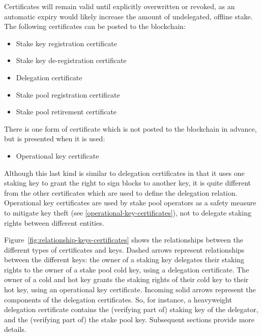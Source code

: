 \documentclass[11pt,a4paper,dvipsnames,twosided]{article}
\begin{document}
Certificates will remain valid
until explicitly overwritten or revoked, as an automatic expiry would
likely increase the amount of undelegated, offline stake. The following
certificates can be posted to the blockchain:
\begin{itemize}
\item Stake key registration certificate
\item Stake key de-registration certificate
\item Delegation certificate
\item Stake pool registration certificate
\item Stake pool retirement certificate
\end{itemize}
There is one form of certificate which is not posted to the blockchain
in advance, but is presented when it is used:
\begin{itemize}
\item
  Operational key certificate
\end{itemize}
Although this last kind is similar to delegation certificates in that
it uses one staking key to grant the right to sign blocks to another
key, it is quite different from the other certificates which are used
to define the delegation relation. Operational key certificates are
used by stake pool operators as a safety measure to mitigate key
theft (see \cref{operational-key-certificates}), not to delegate
staking rights between different entities.

Figure~\ref{fig:relationship-keys-certificates} shows the relationships between
the different types of certificates and keys.
%
Dashed arrows represent relationships between the different keys: the owner of
a staking key delegates their staking rights to the owner of a stake pool cold
key, using a delegation certificate.
%
The owner of a cold and hot key grants the staking rights of their cold key to their
hot key, using an operational key certificate.
%
Incoming solid arrows represent the components of the delegation certificates.
So, for instance, a heavyweight delegation certificate contains the (verifying
part of) staking key of the delegator, and the (verifying part of) the stake
pool key.
%
Subsequent sections provide more details.
\end{document}
